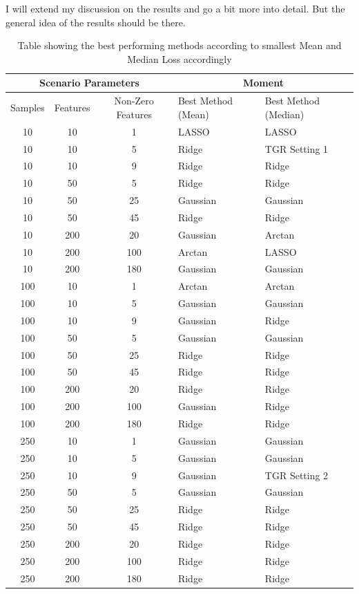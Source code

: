 \documentclass[12pt,a4paper]{article}
\newenvironment{lightbluebox}{%
    \begin{tcolorbox}[colback=lightblue, colframe=lightblue, fontupper=\itshape]%
}{%
    \end{tcolorbox}%
}
\begin{document}
\begin{lightbluebox}
I will extend my discussion on the results and go a bit more into detail. But the general idea of the results should be there.
\end{lightbluebox}

\begin{table}[h!]
\begin{center}
\begin{tabular}{ccc|l|l}
\toprule
\multicolumn{3}{c}{Scenario Parameters} & \multicolumn{2}{c}{Moment}\\
\midrule
Samples & Features & Non-Zero Features & Best Method (Mean) & Best Method (Median) \\
\midrule
10 & 10 & 1 & LASSO & LASSO \\
10 & 10 & 5 & Ridge & TGR Setting 1 \\
10 & 10 & 9 & Ridge & Ridge \\
10 & 50 & 5 & Ridge & Ridge \\
10 & 50 & 25 & Gaussian & Gaussian \\
10 & 50 & 45 & Ridge & Ridge \\
10 & 200 & 20 & Gaussian & Arctan \\
10 & 200 & 100 & Arctan & LASSO \\
10 & 200 & 180 & Gaussian & Gaussian \\
100 & 10 & 1 & Arctan & Arctan \\
100 & 10 & 5 & Gaussian & Gaussian \\
100 & 10 & 9 & Gaussian & Ridge \\
100 & 50 & 5 & Gaussian & Gaussian \\
100 & 50 & 25 & Ridge & Ridge \\
100 & 50 & 45 & Ridge & Ridge \\
100 & 200 & 20 & Ridge & Ridge \\
100 & 200 & 100 & Gaussian & Ridge \\
100 & 200 & 180 & Ridge & Ridge \\
250 & 10 & 1 & Gaussian & Gaussian \\
250 & 10 & 5 & Gaussian & Gaussian \\
250 & 10 & 9 & Gaussian & TGR Setting 2 \\
250 & 50 & 5 & Gaussian & Gaussian \\
250 & 50 & 25 & Ridge & Ridge \\
250 & 50 & 45 & Ridge & Ridge \\
250 & 200 & 20 & Ridge & Ridge \\
250 & 200 & 100 & Ridge & Ridge \\
250 & 200 & 180 & Ridge & Ridge \\
\bottomrule
\end{tabular}
\caption{Table showing the best performing methods according to smallest Mean and Median Loss accordingly}
\end{center}
\label{tab:bestmethod}
\end{table}
\end{document}
